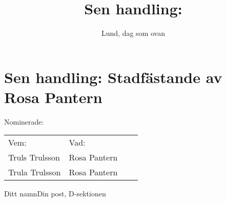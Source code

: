 \documentclass[nopdfbookmarks,a4paper, 11pt, twoside]{article}
\title{Sen handling: \titel}
\newcommand{\titel}{Stadfästande av Rosa Pantern} %
\begin{document}
\section*{Sen handling: \titel}

Nominerade: \par
\begin{tabular}{llll}
    Vem:& Vad:\\
    Truls Trulsson & Rosa Pantern\\
    Trula Trulsson & Rosa Pantern\\
\end{tabular}
\newline

\signature{Lund, dag som ovan}{Ditt namn}{Din post, D-sektionen}
\end{document}
